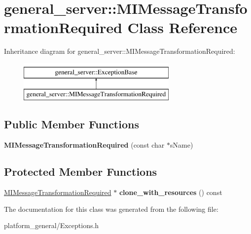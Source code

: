 \hypertarget{classgeneral__server_1_1MIMessageTransformationRequired}{\section{general\-\_\-server\-:\-:\-M\-I\-Message\-Transformation\-Required \-Class \-Reference}
\label{classgeneral__server_1_1MIMessageTransformationRequired}
}
\-Inheritance diagram for general\-\_\-server\-:\-:\-M\-I\-Message\-Transformation\-Required\-:\begin{figure}[H]
\begin{center}
\leavevmode
\includegraphics[height=2.000000cm]{classgeneral__server_1_1MIMessageTransformationRequired}
\end{center}
\end{figure}
\subsection*{\-Public \-Member \-Functions}
\begin{DoxyCompactItemize}
\item 
\hypertarget{classgeneral__server_1_1MIMessageTransformationRequired_a9d4d898e865fed80a6d7a60536aac3d4}{{\bfseries \-M\-I\-Message\-Transformation\-Required} (const char $\ast$s\-Name)}\label{classgeneral__server_1_1MIMessageTransformationRequired_a9d4d898e865fed80a6d7a60536aac3d4}

\end{DoxyCompactItemize}
\subsection*{\-Protected \-Member \-Functions}
\begin{DoxyCompactItemize}
\item 
\hypertarget{classgeneral__server_1_1MIMessageTransformationRequired_a39d465ca1a009877e788c182001bbe14}{\hyperlink{classgeneral__server_1_1MIMessageTransformationRequired}{\-M\-I\-Message\-Transformation\-Required} $\ast$ {\bfseries clone\-\_\-with\-\_\-resources} () const }\label{classgeneral__server_1_1MIMessageTransformationRequired_a39d465ca1a009877e788c182001bbe14}

\end{DoxyCompactItemize}


\-The documentation for this class was generated from the following file\-:\begin{DoxyCompactItemize}
\item 
platform\-\_\-general/\-Exceptions.\-h\end{DoxyCompactItemize}
